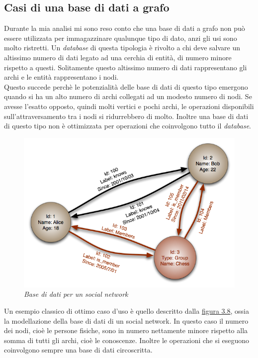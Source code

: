 \subsection{Casi di una base di dati a grafo}
Durante la mia analisi mi sono reso conto che una base di dati a grafo non può essere utilizzata per immagazzinare qualunque tipo di dato, anzi gli usi sono molto ristretti. Un \textit{database} di questa tipologia è rivolto a chi deve salvare un altissimo numero di dati legato ad una cerchia di entità, di numero minore rispetto a questi. Solitamente questo altissimo numero di dati rappresentano gli archi e le entità rappresentano i nodi.\\
Questo succede perchè le potenzialità delle base di dati di questo tipo emergono quando si ha un alto numero di archi collegati ad un modesto numero di nodi. Se avesse l'esatto opposto, quindi molti vertici e pochi archi, le operazioni disponibili sull'attraversamento tra i nodi si ridurrebbero di molto.
Inoltre una base di dati di questo tipo non è ottimizzata per operazioni che coinvolgono tutto il \textit{database}.
\label{fig:social}
\begin{figure}[!ht]
	\centering
	\includegraphics[scale=0.43]{immagini/social.png}
	\caption{\textit{Base di dati per un social network }}
\end{figure}
\newpage
Un esempio classico di ottimo caso d'uso è quello descritto dalla \hyperlink{fig:social}{figura 3.8}, ossia la modellazione della base di dati di un social network. In questo caso il numero dei nodi, cioè le persone fisiche, sono in numero nettamente minore rispetto alla somma di tutti gli archi, cioè le conoscenze. Inoltre le operazioni che si eseguono coinvolgono sempre una base di dati circoscritta.\\

